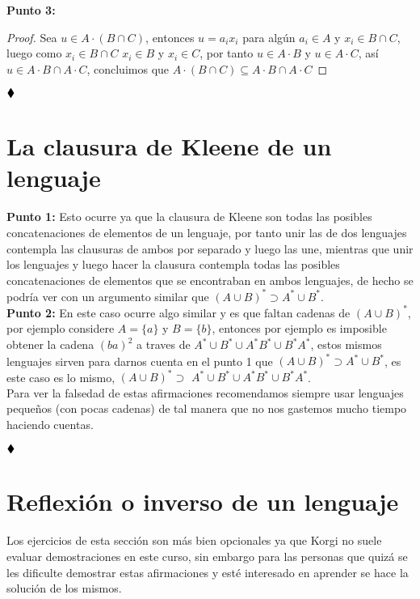\textbf{Punto 3:}

\begin{proof}
Sea $u\in A\cdot(B\cap C)$, entonces $u=a_ix_i$ para algún $a_i\in A$ y $x_i \in B\cap C$, luego como $x_i\in B\cap C$ $x_i\in B$ y $x_i \in C$, por tanto $u \in A\cdot B$ y $u\in A\cdot C$, así $u\in A\cdot B \cap A\cdot C$, concluimos que $A \cdot(B \cap C) \subseteq A \cdot B \cap A \cdot C$

\end{proof}


$\hfill \blacklozenge$

\section{La clausura de Kleene de un lenguaje}

\textbf{Punto 1:} Esto ocurre ya que la clausura de Kleene son todas las posibles concatenaciones de elementos de un lenguaje, por tanto unir las de dos lenguajes contempla las clausuras de ambos por separado y luego las une, mientras que unir los lenguajes y luego hacer la clausura contempla todas las posibles concatenaciones de elementos que se encontraban en ambos lenguajes, de hecho se podría ver con un argumento similar que $(A\cup B)^*\supset A^* \cup B^*$.\\


\textbf{Punto 2:} En este caso ocurre algo similar y es que faltan cadenas de $(A \cup B)^*$, por ejemplo considere $A=\{a\}$ y $B=\{b\}$, entonces por ejemplo es imposible obtener la cadena $(ba)^2$ a traves de $A^* \cup B^* \cup A^* B^* \cup B^* A^*$, estos mismos lenguajes sirven para darnos cuenta en el punto 1 que $(A \cup B)^*\supset A^*\cup B^*$, es este caso es lo mismo, $(A \cup B)^* \supset$ $A^* \cup B^* \cup A^* B^* \cup B^* A^*$.\\

Para ver la falsedad de estas afirmaciones recomendamos siempre usar lenguajes pequeños (con pocas cadenas) de tal manera que no nos gastemos mucho tiempo haciendo cuentas. 


$\hfill \blacklozenge$

\section{Reflexión o inverso de un lenguaje}

Los ejercicios de esta sección son más bien opcionales ya que Korgi no suele evaluar demostraciones en este curso, sin embargo para las personas que quizá se les dificulte demostrar estas afirmaciones y esté interesado en aprender se hace la solución de los mismos.\\

